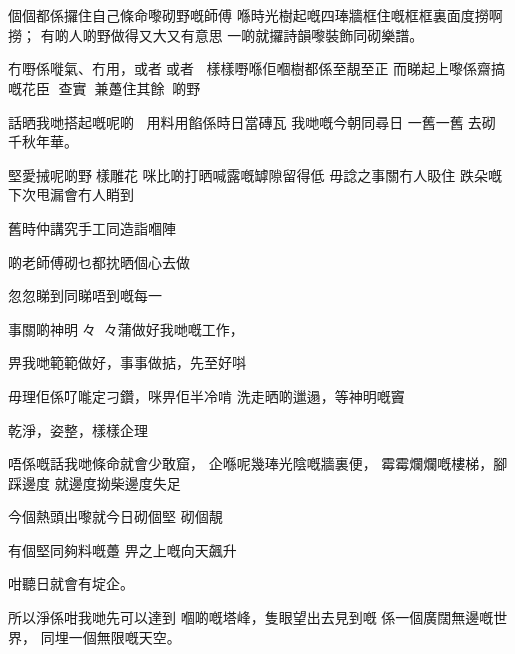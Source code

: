 \chapter{}
個個都係攞住自己條命嚟砌野嘅師傅
喺時光樹起嘅四琫牆框住嘅框框裏面度撈啊撈；
有啲人啲野做得又大又有意思
一啲就攞詩韻嚟裝飾同砌樂譜。

冇嘢係嘥氣、冇用，或者或者；
樣樣嘢喺佢嗰樹都係至靚至正 
而睇起上嚟係齋搞嘅花臣
查實兼躉住其餘󱟡啲野


話晒我哋搭起嘅呢啲
用料用餡係時日當磚瓦
我哋嘅今朝同尋日
一舊一舊󱜩去砌千秋年華。

堅愛𢬿呢啲野樣雕花
咪比啲打晒喊露嘅罅隙留得低
毋諗之事關冇人𥄫住
跌朵嘅下次甩漏會冇人睄到

舊時仲講究手工同造詣嗰陣

啲老師傅砌乜都抌晒個心去做

忽忽睇到同睇唔到嘅每一

事關啲神明󰧵々󱪙󱓻々蒲做好我哋嘅工作，

畀我哋範範做好，事事做掂，先至好唞

毋理佢係𠮩𠹌定刁鑽，咪畀佢半冷啃
洗走晒啲邋遢，等神明嘅竇

乾淨，姿整，樣樣企理

唔係嘅話我哋條命就會少敢窟，
企喺呢幾琫光陰嘅牆裏便，
霉霉爛爛嘅樓梯，腳踩邊度
就邊度拗柴邊度失足

今個熱頭出嚟就今日砌個堅 砌個靚

有個堅同夠料嘅躉
畀之上嘅向天飆升

咁聽日就會有埞企。

所以淨係咁我哋先可以達到
嗰啲嘅塔峰，隻眼望出去見到嘅
係一個廣闊無邊嘅世界，
同埋一個無限嘅天空。